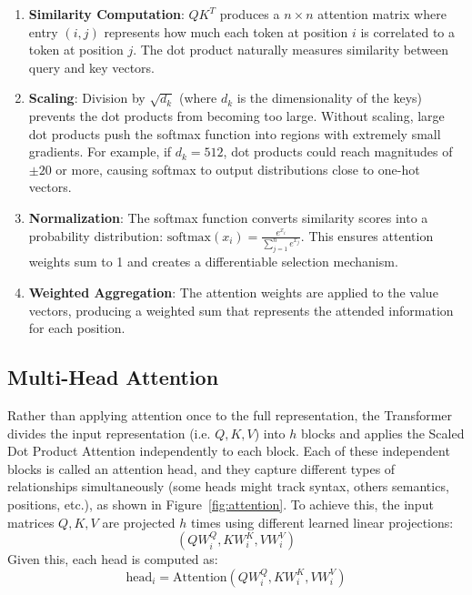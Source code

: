 \begin{enumerate}
   \item \textbf{Similarity Computation}: $QK^T$ produces a $n \times n$ attention matrix where entry $(i,j)$ represents how much each token at position $i$ is correlated to a token at position $j$. The dot product naturally measures similarity between query and key vectors.

   \item \textbf{Scaling}: Division by $\sqrt{d_k}$ (where $d_k$ is the dimensionality of the keys) prevents the dot products from becoming too large. Without scaling, large dot products push the softmax function into regions with extremely small gradients. For example, if $d_k = 512$, dot products could reach magnitudes of $\pm 20$ or more, causing softmax to output distributions close to one-hot vectors.

   \item \textbf{Normalization}: The softmax function converts similarity scores into a probability distribution: $\text{softmax}(x_i) = \frac{e^{x_i}}{\sum_{j=1}^n e^{x_j}}$. This ensures attention weights sum to 1 and creates a differentiable selection mechanism.

   \item \textbf{Weighted Aggregation}: The attention weights are applied to the value vectors, producing a weighted sum that represents the attended information for each position.
\end{enumerate}

\subsection{Multi-Head Attention}

Rather than applying attention once to the full representation, the Transformer divides the input representation (i.e. $Q, K, V$) into $h$ blocks and applies the Scaled Dot Product Attention independently to each block. Each of these independent blocks is called an attention head, and they capture different types of relationships simultaneously (some heads might track syntax, others semantics, positions, etc.), as shown in Figure~\ref{fig:attention}. To achieve this, the input matrices $Q, K, V$ are projected $h$ times using different learned linear projections:
\begin{equation}
(QW_i^Q, KW_i^K, VW_i^V)
\end{equation}
Given this, each head is computed as:
\begin{equation}
\text{head}_i = \text{Attention}(QW_i^Q, KW_i^K, VW_i^V)
\end{equation}

